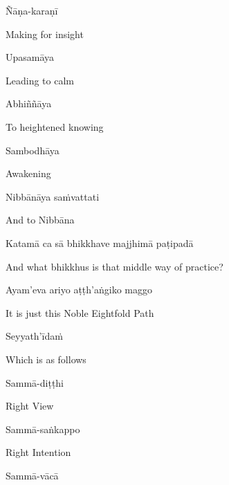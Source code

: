 Ñāṇa-karaṇī

\begin{english}
  Making for insight
\end{english}

Upasamāya

\begin{english}
  Leading to calm
\end{english}

Abhiññāya

\begin{english}
  To heightened knowing
\end{english}

Sambodhāya

\begin{english}
  Awakening
\end{english}

Nibbānāya saṁvattati

\begin{english}
  And to Nibbāna
\end{english}

Katamā ca sā bhikkhave majjhimā paṭipadā

\begin{english}
  And what bhikkhus is that middle way of practice?
\end{english}

Ayam'eva ariyo aṭṭh'aṅgiko maggo

\begin{english}
  It is just this Noble Eightfold Path\ifdigital\makeatletter\hyperlink{endnote51-appendix}\makeatother\fi
\end{english}

Seyyath'īdaṁ

\begin{english}
  Which is as follows
\end{english}

Sammā-diṭṭhi

\begin{english}
  Right View
\end{english}

Sammā-saṅkappo

\begin{english}
  Right Intention
\end{english}

Sammā-vācā

